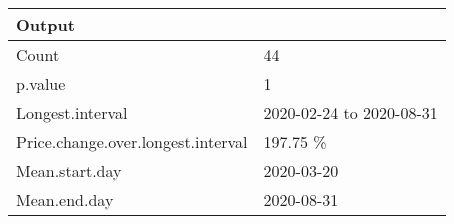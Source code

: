 \begin{table}[!tbp]
\begin{center}
\begin{tabular}{ll}
\hline\hline
\multicolumn{1}{l}{Output}&\multicolumn{1}{c}{}\tabularnewline
\hline
Count&44\tabularnewline
p.value&1\tabularnewline
Longest.interval&2020-02-24 to 2020-08-31\tabularnewline
Price.change.over.longest.interval&197.75 \%\tabularnewline
Mean.start.day&2020-03-20\tabularnewline
Mean.end.day&2020-08-31\tabularnewline
\hline
\end{tabular}\end{center}
\end{table}
